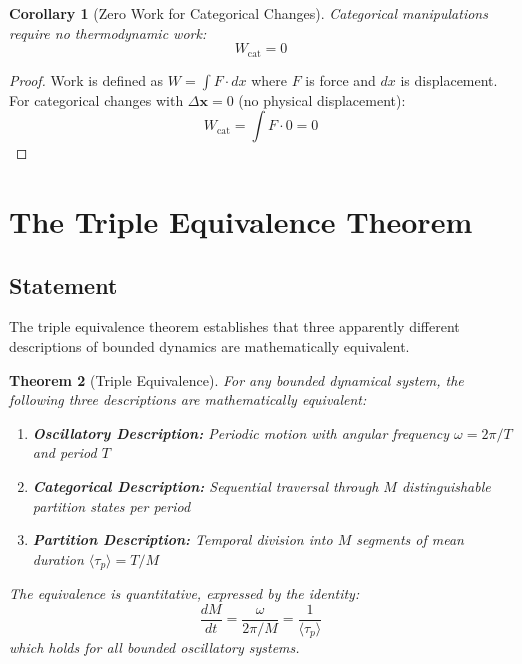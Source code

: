 \documentclass[twocolumn,10pt,twoside]{article}
\newtheorem{theorem}{Theorem}[section]
\newtheorem{corollary}[theorem]{Corollary}
\begin{document}
\begin{corollary}[Zero Work for Categorical Changes]
\label{cor:zero_work}
Categorical manipulations require no thermodynamic work:
\begin{equation}
W_{\text{cat}} = 0
\end{equation}
\end{corollary}

\begin{proof}
Work is defined as $W = \int F \cdot dx$ where $F$ is force and $dx$ is displacement. For categorical changes with $\Delta \mathbf{x} = 0$ (no physical displacement):
\begin{equation}
W_{\text{cat}} = \int F \cdot 0 = 0
\end{equation}
\end{proof}

\section{The Triple Equivalence Theorem}

\subsection{Statement}

The triple equivalence theorem establishes that three apparently different descriptions of bounded dynamics are mathematically equivalent.

\begin{theorem}[Triple Equivalence]
\label{thm:triple_equivalence}
For any bounded dynamical system, the following three descriptions are mathematically equivalent:
\begin{enumerate}[label=(\roman*)]
    \item \textbf{Oscillatory Description:} Periodic motion with angular frequency $\omega = 2\pi/T$ and period $T$
    \item \textbf{Categorical Description:} Sequential traversal through $M$ distinguishable partition states per period
    \item \textbf{Partition Description:} Temporal division into $M$ segments of mean duration $\langle\tau_p\rangle = T/M$
\end{enumerate}

The equivalence is quantitative, expressed by the identity:
\begin{equation}
\frac{dM}{dt} = \frac{\omega}{2\pi/M} = \frac{1}{\langle\tau_p\rangle}
\label{eq:triple_identity}
\end{equation}
which holds for all bounded oscillatory systems.
\end{theorem}
\end{document}
